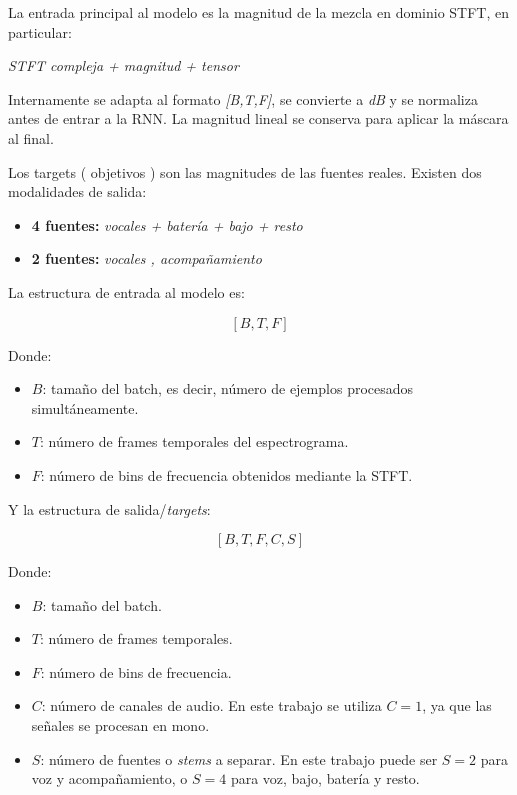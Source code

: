 La entrada principal al modelo es la magnitud de la mezcla en dominio STFT, en particular:

\textit{STFT compleja + magnitud + tensor}

Internamente se adapta al formato \textit{[B,T,F]}, se convierte a \textit{dB} y se normaliza antes de entrar a la RNN.
La magnitud lineal se conserva para aplicar la máscara al final.

Los targets ( objetivos ) son las magnitudes de las fuentes reales. Existen dos modalidades de salida:

\begin{itemize}
    \item \textbf{4 fuentes: } \textit{vocales + batería + bajo + resto}
    \item \textbf{2 fuentes: } \textit{vocales , acompañamiento}
\end{itemize}

La estructura de entrada al modelo es:

\begin{center}
    \[
[B, T, F]
\]
\end{center}
    
Donde:

\begin{itemize}
    \item \(B\): tamaño del batch, es decir, número de ejemplos procesados simultáneamente.
    \item \(T\): número de frames temporales del espectrograma.
    \item \(F\): número de bins de frecuencia obtenidos mediante la STFT.
\end{itemize}

Y la estructura de salida/\textit{targets}:

\begin{center}
  \[
[B, T, F, C, S]
\]  
\end{center}

Donde:

\begin{itemize}
    \item \(B\): tamaño del batch.
    \item \(T\): número de frames temporales.
    \item \(F\): número de bins de frecuencia.
    \item \(C\): número de canales de audio. En este trabajo se utiliza \(C=1\), ya que las señales se procesan en mono.
    \item \(S\): número de fuentes o \textit{stems} a separar. En este trabajo puede ser \(S=2\) para voz y acompañamiento, o \(S=4\) para voz, bajo, batería y resto.
\end{itemize}

